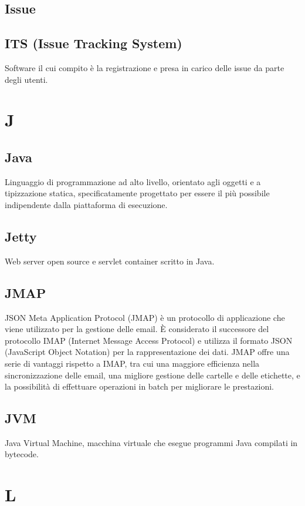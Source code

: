 \documentclass[12pt]{article}
\begin{document}
		\subsection{Issue}
		

		\subsection{ITS (Issue Tracking System)}
		Software il cui compito è la registrazione e presa in carico delle issue da parte degli utenti.
	\clearpage
	\section{J}
		\subsection{Java}
		Linguaggio di programmazione ad alto livello, orientato agli oggetti e a tipizzazione statica, specificatamente progettato per essere il più possibile indipendente dalla piattaforma di esecuzione.
		\subsection{Jetty}
		Web server open source e servlet container scritto in Java.

		\subsection{JMAP}
		JSON Meta Application Protocol (JMAP) è un protocollo di applicazione che viene utilizzato per la gestione delle email. È considerato il successore del protocollo IMAP (Internet Message Access Protocol) e utilizza il formato JSON (JavaScript Object Notation) per la rappresentazione dei dati. JMAP offre una serie di vantaggi rispetto a IMAP, tra cui una maggiore efficienza nella sincronizzazione delle email, una migliore gestione delle cartelle e delle etichette, e la possibilità di effettuare operazioni in batch per migliorare le prestazioni. 

		\subsection{JVM}
		Java Virtual Machine, macchina virtuale che esegue programmi Java compilati in bytecode.
	\clearpage
	\section{L}
\end{document}
